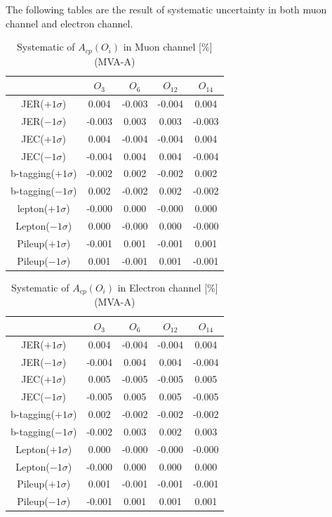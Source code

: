 		The following tables are the result of systematic uncertainty in both muon channel and electron channel.

		\begin{center}
		\setlength{\tabcolsep}{12pt}
		\begin{longtable}{ | c | c c c c | }
		\caption{Systematic of $A_{cp}(O_i)$ in Muon channel [\%] (MVA-A)}\\
		\hline
		 [\%] & $O_3$ & $O_6$ & $O_{12}$ & $O_{14}$ \\
		\hline
		JER($+1\sigma$) & 0.004 & -0.003 & -0.004 & 0.004 \\
		JER($-1\sigma$) & -0.003 & 0.003 & 0.003 & -0.003 \\
		\hline
		JEC($+1\sigma$) & 0.004 & -0.004 & -0.004 & 0.004 \\
		JEC($-1\sigma$) & -0.004 & 0.004 & 0.004 & -0.004 \\
		\hline
		b-tagging($+1\sigma$) & -0.002 & 0.002 & -0.002 & 0.002 \\
		b-tagging($-1\sigma$) & 0.002 & -0.002 & 0.002 & -0.002 \\
		\hline
		lepton($+1\sigma$) & -0.000 & 0.000 & -0.000 & 0.000 \\
		Lepton($-1\sigma$) & 0.000 & -0.000 & 0.000 & -0.000 \\
		\hline
		Pileup($+1\sigma$) & -0.001 & 0.001 & -0.001 & 0.001 \\
		Pileup($-1\sigma$) & 0.001 & -0.001 & 0.001 & -0.001 \\
		\hline
		\end{longtable}
		\end{center}

		\begin{center}
		\setlength{\tabcolsep}{12pt}
		\begin{longtable}{ | c | c c c c | }
		\caption{Systematic of $A_{cp}(O_i)$ in Electron channel [\%] (MVA-A)}\\
		\hline
		 [\%] & $O_3$ & $O_6$ & $O_{12}$ & $O_{14}$ \\
		\hline
		JER($+1\sigma$) & 0.004 & -0.004 & -0.004 & 0.004 \\
		JER($-1\sigma$) & -0.004 & 0.004 & 0.004 & -0.004 \\
		\hline
		JEC($+1\sigma$) & 0.005 & -0.005 & -0.005 & 0.005 \\
		JEC($-1\sigma$) & -0.005 & 0.005 & 0.005 & -0.005 \\
		\hline
		b-tagging($+1\sigma$) & 0.002 & -0.002 & -0.002 & -0.002 \\
		b-tagging($-1\sigma$) & -0.002 & 0.003 & 0.002 & 0.003 \\
		\hline
		Lepton($+1\sigma$) & 0.000 & -0.000 & -0.000 & -0.000 \\
		Lepton($-1\sigma$) & -0.000 & 0.000 & 0.000 & 0.000 \\
		\hline
		Pileup($+1\sigma$) & 0.001 & -0.001 & -0.001 & -0.001 \\
		Pileup($-1\sigma$) & -0.001 & 0.001 & 0.001 & 0.001 \\
		\hline
		\end{longtable}
		\end{center}


